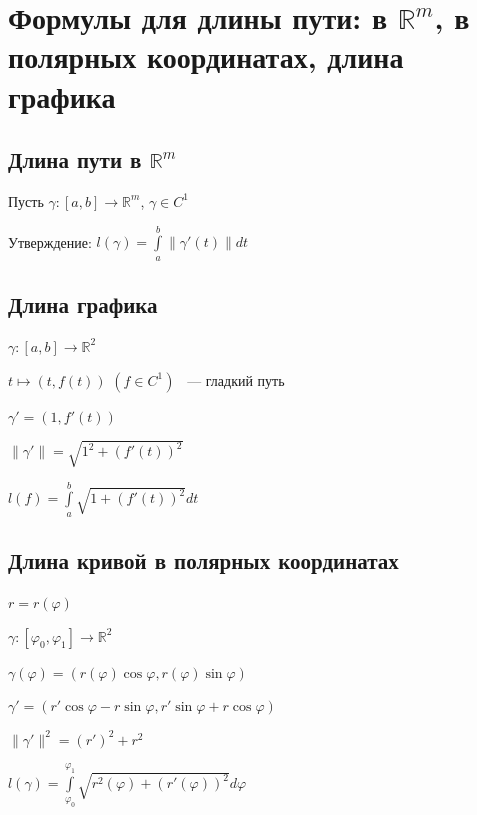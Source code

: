 \documentclass{article}
\begin{document}
    \newpage
    
    \section{Формулы для длины пути: в $\mathbb{R}^m$, в полярных координатах, длина графика}
    
        \subsection{Длина пути в $\mathbb{R}^m$}
            Пусть $\gamma: [a, b] \rightarrow \mathbb{R}^m$, $\gamma \in C^1$
        
            Утверждение: $l(\gamma) = \int\limits^b_a \| \gamma'(t) \| dt$
        
        \subsection{Длина графика}
            
            $\gamma: [a, b] \rightarrow \mathbb{R}^2$
            
            $t \mapsto (t, f(t))$ $(f \in C^1)$ ~--- гладкий путь
            
            $\gamma' = (1, f'(t))$
            
            $\| \gamma' \| = \sqrt{1^2 + (f'(t))^2}$
            
            $l(f) = \int\limits^b_a \sqrt{1 + (f'(t))^2} dt$
            
        \subsection{Длина кривой в полярных координатах}
        
            $r = r(\varphi)$
            
            $\gamma: [\varphi_0, \varphi_1] \rightarrow \mathbb{R}^2$
            
            $\gamma(\varphi) = (r(\varphi) \cos{\varphi}, r(\varphi) \sin{\varphi})$
            
            $\gamma' = (r'\cos{\varphi} - r\sin{\varphi}, r'\sin{\varphi} + r \cos{\varphi})$
            
            $\| \gamma' \|^2 = (r')^2 + r^2$
            
            $l(\gamma) = \int\limits^{\varphi_1}_{\varphi_0} \sqrt{r^2(\varphi) + (r'(\varphi))^2} d\varphi$
            
\end{document}
